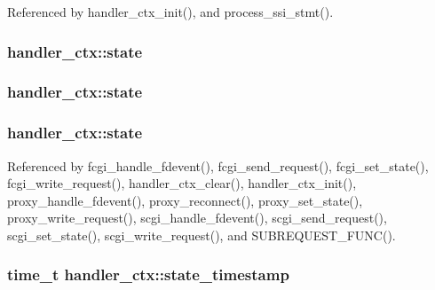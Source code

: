 Referenced by handler\-\_\-ctx\-\_\-init(), and process\-\_\-ssi\-\_\-stmt().

\hypertarget{structhandler__ctx_a49e55dfa1741b510b000d8fe5704b16c}{
\subsubsection[{state}]{ handler\-\_\-ctx\-::state}}\label{structhandler__ctx_a49e55dfa1741b510b000d8fe5704b16c}
\hypertarget{structhandler__ctx_a127fecd40c1c20963cbbc2f44dcf4775}{
\subsubsection[{state}]{ handler\-\_\-ctx\-::state}}\label{structhandler__ctx_a127fecd40c1c20963cbbc2f44dcf4775}
\hypertarget{structhandler__ctx_a9d4ded0cd96820cde61a4c1fcfeba4b0}{
\subsubsection[{state}]{ handler\-\_\-ctx\-::state}}\label{structhandler__ctx_a9d4ded0cd96820cde61a4c1fcfeba4b0}


Referenced by fcgi\-\_\-handle\-\_\-fdevent(), fcgi\-\_\-send\-\_\-request(), fcgi\-\_\-set\-\_\-state(), fcgi\-\_\-write\-\_\-request(), handler\-\_\-ctx\-\_\-clear(), handler\-\_\-ctx\-\_\-init(), proxy\-\_\-handle\-\_\-fdevent(), proxy\-\_\-reconnect(), proxy\-\_\-set\-\_\-state(), proxy\-\_\-write\-\_\-request(), scgi\-\_\-handle\-\_\-fdevent(), scgi\-\_\-send\-\_\-request(), scgi\-\_\-set\-\_\-state(), scgi\-\_\-write\-\_\-request(), and S\-U\-B\-R\-E\-Q\-U\-E\-S\-T\-\_\-\-F\-U\-N\-C().

\hypertarget{structhandler__ctx_abc3f39f09ee8ae00d8ca6f2db7efec9c}{
\subsubsection[{state\-\_\-timestamp}]{\setlength{\rightskip}{0pt plus 5cm}time\-\_\-t handler\-\_\-ctx\-::state\-\_\-timestamp}}\label{structhandler__ctx_abc3f39f09ee8ae00d8ca6f2db7efec9c}


